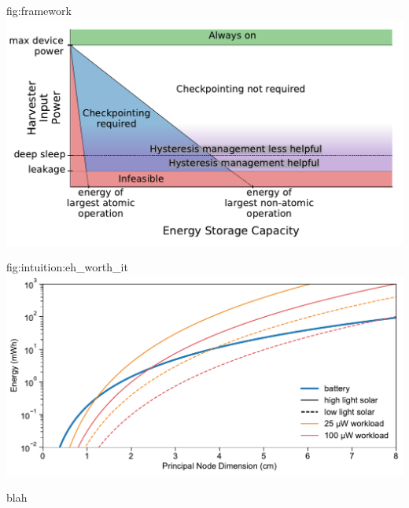 \begin{definefigure}{fig:framework}
  \centering
  \includegraphics[width=\columnwidth]{figs/capacity/harvesting_framework/framework}
  \caption{
  \normalfont Design space for energy harvesting sensors based on their energy
  income (which we assume is constant for this analysis), energy storage capacity, and workload.
  Workload is represented by the largest atomic/non-atomic operations supported
  by a design, as well as the deep sleep and leakage power.  The plot breaks
  into four regions: \textbf{1)} always
  on or effectively powered, \textbf{2)} Infeasible due to lack of energy storage or
  leakage higher than harvesting rate \textbf{3)} Feasible but requires checkpointing
  to make forward progress, and \textbf{4)} Enough energy storage to not require
  or benefit from checkpointing. Additionally, sensors which have high
  power when they enter deep sleep before depleting their
  energy buffer may benefit from hysteresis management techniques.
  This benefit diminishes with lower sleep currents and higher harvesting potential.
  }
\end{definefigure}


\begin{definefigure}{fig:intuition:eh_worth_it}
  \centering
  \includegraphics[width=\columnwidth]{figs/is_eh_worth_it.pdf}
  \caption{
  blah
  }
\end{definefigure}